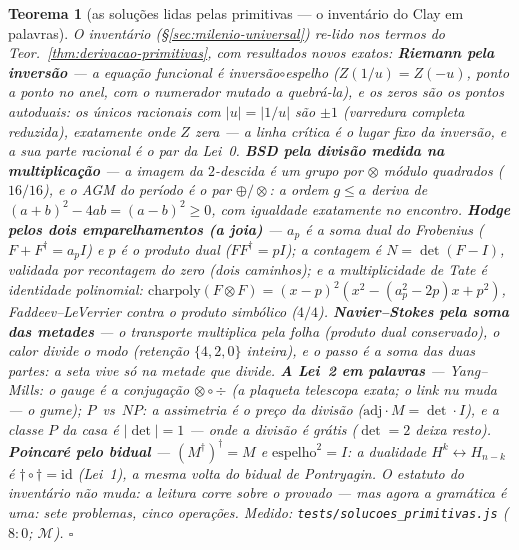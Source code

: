 \documentclass[11pt,a4paper]{article}
\newtheorem{teorema}{Teorema}
\newcommand{\code}[1]{\texttt{\small #1}}
\begin{document}
\begin{teorema}[as soluções lidas pelas primitivas --- o inventário do
Clay em palavras]\label{thm:solucoes-primitivas}
O inventário (\S\ref{sec:milenio-universal}) re-lido nos termos do
Teor.~\ref{thm:derivacao-primitivas}, com resultados novos exatos:
\textbf{Riemann pela inversão} --- a equação funcional é
inversão$\circ$espelho ($Z(1/u)=Z(-u)$, ponto a ponto no anel, com o
numerador mutado a quebrá-la), e \emph{os zeros são os pontos
autoduais}: os únicos racionais com $|u|=|1/u|$ são $\pm1$
(varredura completa reduzida), exatamente onde $Z$ zera --- a linha
crítica é o lugar fixo da inversão, e a sua parte racional é o par da
Lei~0.
\textbf{BSD pela divisão medida na multiplicação} --- a imagem da
$2$-descida é um \emph{grupo} por $\otimes$ módulo quadrados
($16/16$), e o AGM do período é o par $\oplus/\otimes$: a ordem
$g\le a$ \emph{deriva} de $(a{+}b)^{2}-4ab=(a{-}b)^{2}\ge0$, com
igualdade exatamente no encontro.
\textbf{Hodge pelos dois emparelhamentos (a joia)} --- $a_{p}$ é a
\emph{soma dual} do Frobenius ($F+F^{\dagger}=a_{p}I$) e $p$ é o
\emph{produto dual} ($F F^{\dagger}=pI$); a contagem é
$\boxed{N=\det(F-I)}$, validada por recontagem do zero (dois
caminhos); e a multiplicidade de Tate é identidade polinomial:
$\mathrm{charpoly}(F{\otimes}F)=(x{-}p)^{2}(x^{2}-(a_{p}^{2}{-}2p)x+p^{2})$,
Faddeev--LeVerrier contra o produto simbólico ($4/4$).
\textbf{Navier--Stokes pela soma das metades} --- o transporte
\emph{multiplica} pela folha (produto dual conservado), o calor
\emph{divide} o modo (retenção $\{4,2,0\}$ inteira), e o passo é a
soma das duas partes: a seta vive só na metade que divide.
\textbf{A Lei~2 em palavras} --- Yang--Mills: o gauge é a conjugação
$\otimes\circ\div$ (a plaqueta telescopa exata; o link nu muda --- o
gume); $P$~vs~$NP$: a assimetria é \emph{o preço da divisão}
($\mathrm{adj}\cdot M=\det\cdot I$), e a classe $P$ da casa é
$|\det|=1$ --- onde a divisão é grátis ($\det=2$ deixa resto).
\textbf{Poincaré pelo bidual} --- $(M^{\dagger})^{\dagger}=M$ e
$\mathrm{espelho}^{2}=I$: a dualidade $H^{k}\leftrightarrow H_{n-k}$
é $\dagger\circ\dagger=\mathrm{id}$ (Lei~1), a mesma volta do bidual
de Pontryagin. O estatuto do inventário não muda: a leitura corre
sobre o provado --- mas agora \emph{a gramática é uma}: sete
problemas, cinco operações.
\emph{Medido:} \code{tests/solucoes\_primitivas.js} ($8{:}0$;
$\mathcal{M}$).
$\square$
\end{teorema}
\end{document}
